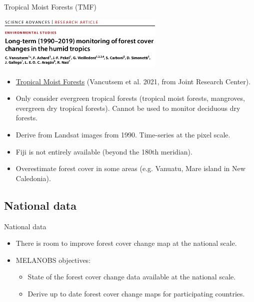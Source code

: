 \documentclass[10pt,table,dvipsnames,compress]{beamer}
\begin{document}
\begin{frame}[label={sec:orga29183f}]{Tropical Moist Forests (TMF)}
\begin{center}
\includegraphics[width=8cm]{figs/fcc/Vancutsem2021.png}
\end{center}

\begin{itemize}
\item \href{https://forobs.jrc.ec.europa.eu/TMF}{Tropical Moist Forests} (Vancutsem et al. 2021, from Joint Research Center).
\item Only consider evergreen tropical forests (tropical moist forests, mangroves, evergreen dry tropical forests). Cannot be used to monitor deciduous dry forests.
\item Derive from Landsat images from 1990. Time-series at the pixel scale.
\item Fiji is not entirely available (beyond the 180th meridian).
\item Overestimate forest cover in some areas (e.g. Vanuatu, Mare island in New Caledonia).
\end{itemize}
\end{frame}

\subsection{National data}
\label{sec:orgd81643d}

\begin{frame}[label={sec:orga912976}]{National data}
\begin{itemize}
\item There is room to improve forest cover change map at the national scale.

\item MELANOBS objectives:
\begin{itemize}
\item State of the forest cover change data available at the national scale.
\item Derive up to date forest cover change maps for participating countries.
\end{itemize}
\end{itemize}
\end{frame}
\end{document}
